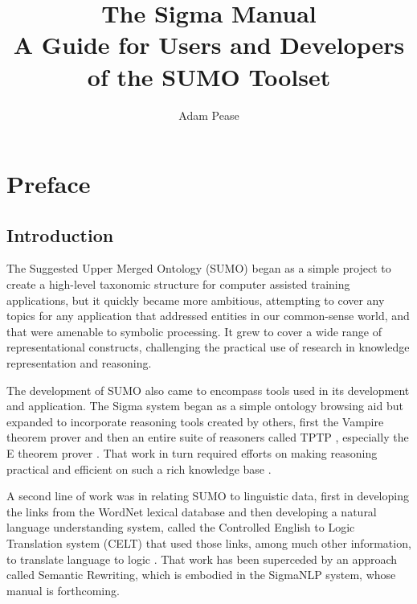 \documentclass{book}
\begin{document}
\title{The Sigma Manual \\ A Guide for Users and Developers \\ of the SUMO Toolset}
\author{Adam Pease}

\maketitle
\date

\nomtcrule
\dominitoc[n]
\setcounter{secnumdepth}{1}
\setcounter{tocdepth}{1}
\tableofcontents
\listoffigures

\chapter{Preface}

\section{Introduction}

The Suggested Upper Merged Ontology (SUMO) began as a simple project to create a
high-level taxonomic structure for computer assisted training applications, but
it quickly became more ambitious, attempting to cover any topics for any
application that addressed entities in our common-sense world, and that were
amenable to symbolic processing.  It grew to cover a wide range of
representational constructs, challenging the practical use of research in
knowledge representation and reasoning.

The development of SUMO also came to encompass tools used in its development and
application.  The Sigma system \cite{p03} began as a simple ontology browsing
aid but expanded to incorporate reasoning tools created by others, first the
Vampire theorem prover \cite{RV:AICOM-2002} and then an entire suite of
reasoners called TPTP \cite{tsp08}, especially the E theorem prover
\cite{Schulz:AICOM-2002}.  That work in turn required efforts on making
reasoning practical and efficient on such a rich knowledge base \cite{psst10}.

\begin{sloppypar}
A second line of work was in relating SUMO to linguistic data, first in
developing the links from the WordNet \cite{fellbaum1998wordnet} lexical
database \cite{np03} and then developing a natural language understanding
system, called the Controlled English to Logic Translation system (CELT) that
used those links, among much other information, to translate language to logic
\cite{pl10}.  That work has been superceded by an approach called Semantic
Rewriting, which is embodied in the SigmaNLP system, whose manual is forthcoming.
\end{sloppypar}
\end{document}
